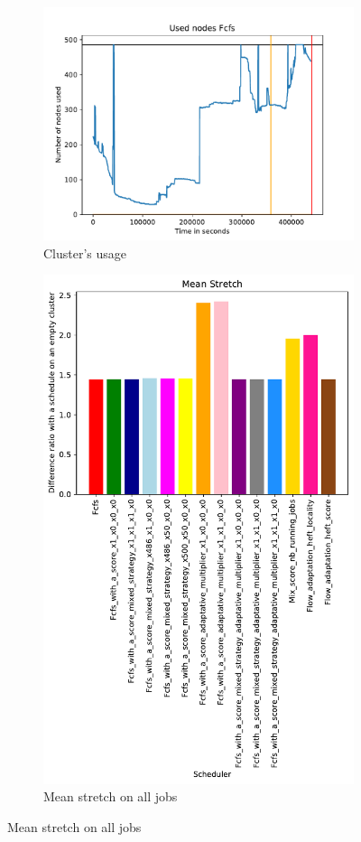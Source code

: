\documentclass[a4paper]{article}
\begin{document}
\begin{figure}[H]\centering
\begin{subfigure}[b]{0.4\linewidth}\centering\includegraphics[width=1\linewidth]{MBSS/plot/2022-09-08->2022-09-08_V85105_Fcfs_Used_nodes_450_128_32_256_4_1024.pdf}\caption{Cluster's usage}\end{subfigure}
\begin{subfigure}[b]{0.4\linewidth}\centering\includegraphics[width=0.9\linewidth]{MBSS/plot/Results_FCFS_Score_Adaptative_Multiplier_2022-09-08->2022-09-08_V9271_Mean_Stretch_450_128_32_256_4_1024.pdf}\caption{Mean stretch on all jobs}\end{subfigure}

\end{figure}
\end{document}
